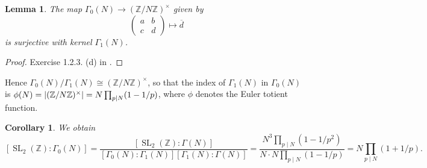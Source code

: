 \documentclass[10pt,leqno,twoside]{article}
\theoremstyle{plain}
\newtheorem{lemma}[lem]{Lemma}
\newtheorem{corollary}[lem]{Corollary}
\theoremstyle{definition}
\numberwithin{equation}{section}
\numberwithin{lem}{section}
\DeclareMathOperator{\SL}{SL}
\newcommand{\smod}[1]{\;(\bmod\; #1)}
\newcommand{\abcd}{\begin{pmatrix}
    a & b \\ c & d
\end{pmatrix}}
\newcommand{\slz}{\SL_2(\mathbb{Z})}
\begin{document}
\begin{lemma}
    The map $\varGamma_0(N)\to (\mathbb{Z}/N\mathbb{Z})^\times$ given by \[\abcd\mapsto \overline d\] 
    is surjective with kernel $\varGamma_1(N)$.
\end{lemma}
\begin{proof}
    Exercise 1.2.3. (d) in \cite{diamond}.%
\end{proof}
Hence $\varGamma_0(N)/\varGamma_1(N)\cong (\mathbb{Z}/N\mathbb{Z})^\times$, so that the index of $\varGamma_1(N)$ in $\varGamma_0(N)$ is $\phi(N) = \abs{(\mathbb{Z}/N\mathbb{Z})^\times} = N\prod_{p\mid N}(1-1/p)$, where $\phi$ denotes the Euler totient function. 
\begin{corollary}
    We obtain \[[\slz : \varGamma_0(N)] = \frac{[\slz : \varGamma(N)]}{[\varGamma_0(N) : \varGamma_1(N)][\varGamma_1(N) : \varGamma(N)]} = \frac{N^3\prod_{p\mid N}(1-1/p^2)}{N\cdot N\prod_{p\mid N}(1-1/p)} = N\prod_{p\mid N}(1+1/p).\]
\end{corollary} 
\end{document}
